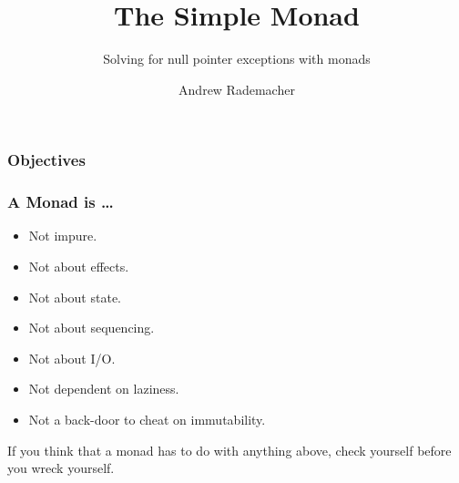 \documentclass{beamer}
\begin{document}
    \title{The Simple Monad}
    \subtitle{Solving for null pointer exceptions with monads}
    \author{Andrew Rademacher}



    \frame{\titlepage}

    \begin{frame}
        \frametitle{Objectives}

    \end{frame}

    \begin{frame}
        \frametitle{A Monad is \ldots}

        \begin{itemize}
            \item Not impure.
            \item Not about effects.
            \item Not about state.
            \item Not about sequencing.
            \item Not about I/O.
            \item Not dependent on laziness.
            \item Not a back-door to cheat on immutability.
        \end{itemize}

        If you think that a monad has to do with anything above,
        check yourself before you wreck yourself.
    \end{frame}
\end{document}
